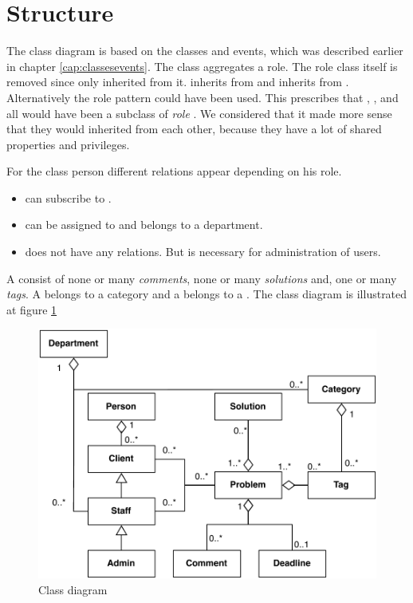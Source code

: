 \section{Structure}
\label{sec:problem_structure}
The class diagram is based on the classes and events, which was described earlier in chapter \ref{cap:classesevents}. The class  aggregates a role. The role class itself is removed since only \class{\client[]} inherited from it. \class{\staff[]} inherits from \class{\client[]} and \class{\admin[]} inherits from \cl{\staff[]}. Alternatively the role pattern could have been used. This prescribes that \class{\client[]}, \class{\staff[]}, and \class{\admin[]} all would have been a subclass of \textit{role}  \cite[p. 80]{roedeaalborg}. We considered that it made more sense that they would inherited from each other, because they have a lot of shared properties and privileges.

For the class person different relations appear depending on his role. 
\begin{itemize}
\item {} can subscribe to .
\item \class{\staff[]} can be assigned to  and \class{\staff[]} belongs to a department. 
\item \class{\admin[]} does not have any relations. But is necessary for administration of users.  
\end{itemize}

A \problem[] consist of none or many \textit{comments}, none or many \textit{solutions} and, one or many \textit{tags}. A  belongs to a category and a  belongs to a .  The class diagram is illustrated at figure \ref{fig:pdaclassdiagram}

\begin{figure}
\begin{center}
\includegraphics[scale=0.6]{input/problem_domain_analysis/newest_class_diagram.pdf}
\caption{Class diagram}
\label{fig:pdaclassdiagram}
\end{center}
\end{figure}